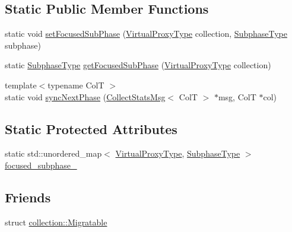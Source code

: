 \subsection*{Static Public Member Functions}
\begin{DoxyCompactItemize}
\item 
static void \hyperlink{structvt_1_1vrt_1_1collection_1_1balance_1_1_collection_stats_aff48149448c2a2f8569ce9027d63309e}{set\+Focused\+Sub\+Phase} (\hyperlink{namespacevt_a1b417dd5d684f045bb58a0ede70045ac}{Virtual\+Proxy\+Type} collection, \hyperlink{namespacevt_ae78cbfdf1e57470e33eedb074f2beeba}{Subphase\+Type} subphase)
\item 
static \hyperlink{namespacevt_ae78cbfdf1e57470e33eedb074f2beeba}{Subphase\+Type} \hyperlink{structvt_1_1vrt_1_1collection_1_1balance_1_1_collection_stats_a52ac1b209e2f1491300acd06bb82fd22}{get\+Focused\+Sub\+Phase} (\hyperlink{namespacevt_a1b417dd5d684f045bb58a0ede70045ac}{Virtual\+Proxy\+Type} collection)
\item 
{\footnotesize template$<$typename ColT $>$ }\\static void \hyperlink{structvt_1_1vrt_1_1collection_1_1balance_1_1_collection_stats_a6ec9d92b03b0d5208d99e9538a33b785}{sync\+Next\+Phase} (\hyperlink{structvt_1_1vrt_1_1collection_1_1balance_1_1_collect_stats_msg}{Collect\+Stats\+Msg}$<$ ColT $>$ $\ast$msg, ColT $\ast$col)
\end{DoxyCompactItemize}
\subsection*{Static Protected Attributes}
\begin{DoxyCompactItemize}
\item 
static std\+::unordered\+\_\+map$<$ \hyperlink{namespacevt_a1b417dd5d684f045bb58a0ede70045ac}{Virtual\+Proxy\+Type}, \hyperlink{namespacevt_ae78cbfdf1e57470e33eedb074f2beeba}{Subphase\+Type} $>$ \hyperlink{structvt_1_1vrt_1_1collection_1_1balance_1_1_collection_stats_ac0918866996d63bbefca55a9d6a7e65e}{focused\+\_\+subphase\+\_\+}
\end{DoxyCompactItemize}
\subsection*{Friends}
\begin{DoxyCompactItemize}
\item 
struct \hyperlink{structvt_1_1vrt_1_1collection_1_1balance_1_1_collection_stats_ad16bcfc5db0df5769bebcb8888c723d0}{collection\+::\+Migratable}
\end{DoxyCompactItemize}

